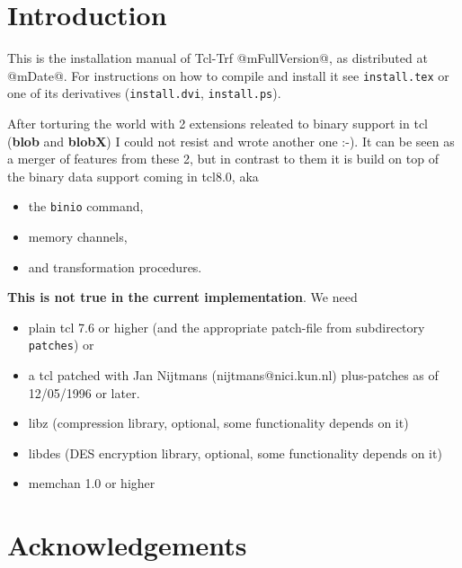 \def\strong#1{{\bf #1}}
\def\lang#1{{\tt #1}}
\def\file#1{{\tt #1}}
\def\arg#1{{\tt $<$#1$>$}}
\def\trf{\strong {trf}}
\def\blob{\strong {blob}}
\def\blobx{\strong {blobX}}
\def\tcl{\lang {tcl}}
\def\cmd#1{{\tt #1}}
\def\opt#1{{\tt #1}}
\def\man#1{{\tt #1}}
\def\lib#1{{\tt #1}}
\def\url#1{{\tt #1}}

\def\version{1.0}

\tableofcontents

\chapter {Introduction}
This is the installation manual of Tcl-Trf @mFullVersion@, as distributed
at @mDate@. For instructions on how to compile and install it see \file
{install.tex} or one of its derivatives (\file {install.dvi}, \file {install.ps}).

After torturing the world with 2 extensions releated to binary support
in tcl (\blob{} and \blobx{}) I could not resist and wrote another
one :-). It can be seen as a merger of features from these 2, but in
contrast to them it is build on top of the binary data support coming
in tcl8.0, aka

\begin{itemize}
\item	the \cmd{binio} command,
\item	memory channels,
\item	and transformation procedures.
\end{itemize}

\strong {This is not true in the current implementation}. We need

\begin{itemize}
\item	plain tcl 7.6 or higher (and the appropriate patch-file from
	subdirectory \file {patches}) or

\item	a tcl patched with Jan Nijtmans (nijtmans@nici.kun.nl)
	plus-patches as of 12/05/1996 or later.

\item	libz (compression library, optional, some functionality depends on it)
\item	libdes (DES encryption library, optional, some functionality depends on it)
\item	memchan 1.0 or higher
\end{itemize}


\chapter {Acknowledgements}

